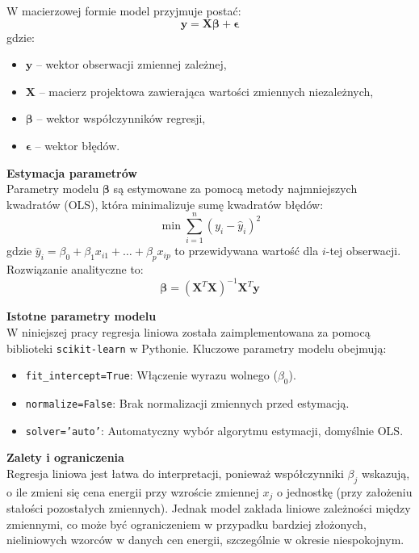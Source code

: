 W macierzowej formie model przyjmuje postać:
\begin{equation}
\mathbf{y} = \mathbf{X} \boldsymbol{\beta} + \boldsymbol{\epsilon}
\end{equation}
gdzie:
\begin{itemize}
    \item \( \mathbf{y} \) -- wektor obserwacji zmiennej zależnej,
    \item \( \mathbf{X} \) -- macierz projektowa zawierająca wartości zmiennych niezależnych,
    \item \( \boldsymbol{\beta} \) -- wektor współczynników regresji,
    \item \( \boldsymbol{\epsilon} \) -- wektor błędów.
\end{itemize}

\textbf{Estymacja parametrów} \\
Parametry modelu \( \boldsymbol{\beta} \) są estymowane za pomocą metody najmniejszych kwadratów (OLS), która minimalizuje sumę kwadratów błędów:
\begin{equation}
\min \sum_{i=1}^n (y_i - \hat{y}_i)^2
\end{equation}
gdzie \( \hat{y}_i = \beta_0 + \beta_1 x_{i1} + \dots + \beta_p x_{ip} \) to przewidywana wartość dla \( i \)-tej obserwacji. Rozwiązanie analityczne to:
\begin{equation}
\boldsymbol{\beta} = (\mathbf{X}^T \mathbf{X})^{-1} \mathbf{X}^T \mathbf{y}
\end{equation}

\textbf{Istotne parametry modelu} \\
W niniejszej pracy regresja liniowa została zaimplementowana za pomocą biblioteki \texttt{scikit-learn} w Pythonie. Kluczowe parametry modelu obejmują:
\begin{itemize}
    \item \texttt{fit\_intercept=True}: Włączenie wyrazu wolnego (\( \beta_0 \)).
    \item \texttt{normalize=False}: Brak normalizacji zmiennych przed estymacją.
    \item \texttt{solver='auto'}: Automatyczny wybór algorytmu estymacji, domyślnie OLS.
\end{itemize}

\textbf{Zalety i ograniczenia} \\
Regresja liniowa jest łatwa do interpretacji, ponieważ współczynniki \( \beta_j \) wskazują, o ile zmieni się cena energii przy wzroście zmiennej \( x_j \) o jednostkę (przy założeniu stałości pozostałych zmiennych). Jednak model zakłada liniowe zależności między zmiennymi, co może być ograniczeniem w przypadku bardziej złożonych, nieliniowych wzorców w danych cen energii, szczególnie w okresie niespokojnym.

